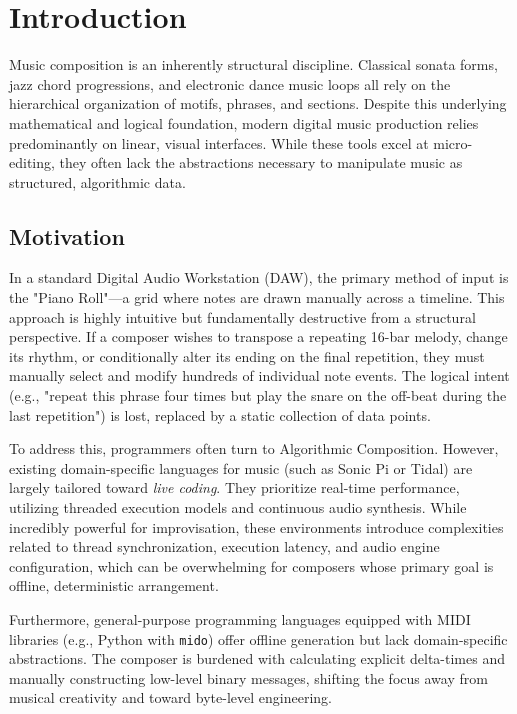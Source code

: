 \chapter{Introduction}\label{ch:introduction}

Music composition is an inherently structural discipline. Classical sonata forms, jazz chord progressions,
and electronic dance music loops all rely on the hierarchical organization of motifs, phrases, and sections.
Despite this underlying mathematical and logical foundation, modern digital music production relies
predominantly on linear, visual interfaces. While these tools excel at micro-editing, they often lack the
abstractions necessary to manipulate music as structured, algorithmic data.

\section{Motivation}

In a standard Digital Audio Workstation (DAW), the primary method of input is the "Piano Roll"—a grid where
notes are drawn manually across a timeline. This approach is highly intuitive but fundamentally destructive
from a structural perspective. If a composer wishes to transpose a repeating 16-bar melody, change its
rhythm, or conditionally alter its ending on the final repetition, they must manually select and modify
hundreds of individual note events. The logical intent (e.g., "repeat this phrase four times but play the
snare on the off-beat during the last repetition") is lost, replaced by a static collection of data points.

To address this, programmers often turn to Algorithmic Composition. However, existing domain-specific
languages for music (such as Sonic Pi or Tidal) are largely tailored toward \textit{live coding}. They
prioritize real-time performance, utilizing threaded execution models and continuous audio synthesis. While
incredibly powerful for improvisation, these environments introduce complexities related to thread
synchronization, execution latency, and audio engine configuration, which can be overwhelming for composers
whose primary goal is offline, deterministic arrangement.

Furthermore, general-purpose programming languages equipped with MIDI libraries (e.g., Python with
\texttt{mido}) offer offline generation but lack domain-specific abstractions. The composer is burdened with
calculating explicit delta-times and manually constructing low-level binary messages, shifting the focus away
from musical creativity and toward byte-level engineering.

